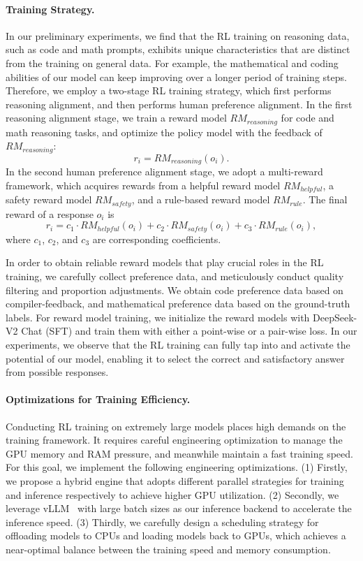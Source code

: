 \documentclass[11pt, a4paper, logo, copyright, nonumbering]{deepseek}
\newcommand{\dsviisft}{DeepSeek-V2 Chat (SFT)}
\begin{document}
\begin{CJK*}{UTF8}{gbsn}
\paragraph{Training Strategy.}
In our preliminary experiments, we find that the RL training on reasoning data, such as code and math prompts, exhibits unique characteristics that are distinct from the training on general data. 
For example, the mathematical and coding abilities of our model can keep improving over a longer period of training steps.
Therefore, we employ a two-stage RL training strategy, which first performs reasoning alignment, and then performs human preference alignment.
In the first reasoning alignment stage, we train a reward model $RM_{reasoning}$ for code and math reasoning tasks, and optimize the policy model with the feedback of $RM_{reasoning}$:
\begin{equation}
    r_i=RM_{reasoning}(o_i). 
\end{equation}
In the second human preference alignment stage, we adopt a multi-reward framework, which acquires rewards from a helpful reward model $RM_{helpful}$, a safety reward model $RM_{safety}$, and a rule-based reward model $RM_{rule}$. 
The final reward of a response $o_i$ is
\begin{equation}
    r_i = c_1 \cdot RM_{helpful}(o_i) + c_2 \cdot RM_{safety}(o_i) + c_3 \cdot RM_{rule}(o_i), 
\end{equation}
where $c_1$, $c_2$, and $c_3$ are corresponding coefficients. 

In order to obtain reliable reward models that play crucial roles in the RL training, we carefully collect preference data, and meticulously conduct quality filtering and proportion adjustments. 
We obtain code preference data based on compiler-feedback, and mathematical preference data based on the ground-truth labels.
For reward model training, we initialize the reward models with \dsviisft{} and train them with either a point-wise or a pair-wise loss.
In our experiments, we observe that the RL training can fully tap into and activate the potential of our model, enabling it to select the correct and satisfactory answer from possible responses. 

\paragraph{Optimizations for Training Efficiency.}
Conducting RL training on extremely large models places high demands on the training framework. 
It requires careful engineering optimization to manage the GPU memory and RAM pressure, and meanwhile maintain a fast training speed.
For this goal, we implement the following engineering optimizations. 
(1) Firstly, we propose a hybrid engine that adopts different parallel strategies for training and inference respectively to achieve higher GPU utilization. 
(2) Secondly, we leverage vLLM~\citep{kwon2023efficient} with large batch sizes as our inference backend to accelerate the inference speed. 
(3) Thirdly, we carefully design a scheduling strategy for offloading models to CPUs and loading models back to GPUs, which achieves a near-optimal balance between the training speed and memory consumption. 


\end{CJK*}
\end{document}

